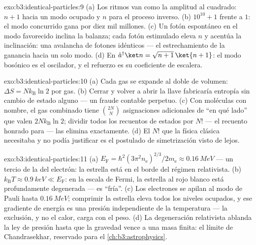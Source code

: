 \begin{solution}{exo:b3:identical-particles:9}
(a) Los ritmos van como la amplitud al cuadrado: $n + 1$ hacia un modo
ocupado y $n$ para el proceso inverso. (b) $10^{10} + 1$ frente a $1$: el
modo concurrido gana por diez mil millones. (c) Un fotón espontáneo en
el modo favorecido inclina la balanza; cada fotón estimulado eleva
$n$ y acentúa la inclinación: una avalancha de fotones idénticos ---
el estrechamiento de la ganancia hacia un solo modo. (d) En $\hat a^\dagger\ket n =
\sqrt{n+1}\,\ket{n+1}$: el modo bosónico es el oscilador, y
el refuerzo es su coeficiente de escalera.
\end{solution}

\begin{solution}{exo:b3:identical-particles:10}
(a) Cada gas se expande al doble de volumen: $\Delta S =
Nk_{\text{B}}\ln2$ por gas. (b) Cerrar y volver a abrir la llave
fabricaría entropía sin cambio de estado alguno ---
un fraude contable perpetuo. (c) Con moléculas con nombre, el
gas combinado tiene $\binom{2N}{N}$ asignaciones adicionales de ``en qué
lado'' que valen $2Nk_{\text{B}}\ln2$; dividir todos los recuentos de
estados por $N!$ --- el recuento honrado para  --- las
elimina exactamente.
(d) El $N!$ que la física clásica necesitaba y no podía justificar
es el postulado de simetrización visto de lejos.
\end{solution}

\begin{solution}{exo:b3:identical-particles:11}
(a) $E_{\text{F}} = \hbar^2(3\pi^2n_{\text{e}})^{2/3}/2m_{\text{e}}
\approx \qty{0.16}{MeV}$ --- un tercio de la  del
electrón: la estrella está en el borde del régimen relativista. (b)
$k_{\text{B}}T \approx \qty{0.9}{keV} \ll E_{\text{F}}$: en la escala de
Fermi, la estrella al rojo blanco está profundamente degenerada --- es
``fría''. (c) Los electrones se apilan al modo de Pauli hasta
$\qty{0.16}{MeV}$; comprimir la estrella eleva todos los niveles ocupados, y
ese gradiente de energía es una presión independiente de la
temperatura --- la exclusión, y no el calor, carga con el peso. (d)
La degeneración relativista ablanda la ley de presión hasta que la gravedad
vence a una masa finita: el límite de Chandrasekhar, reservado para el
\cref{ch:b3:astrophysics}.
\end{solution}

